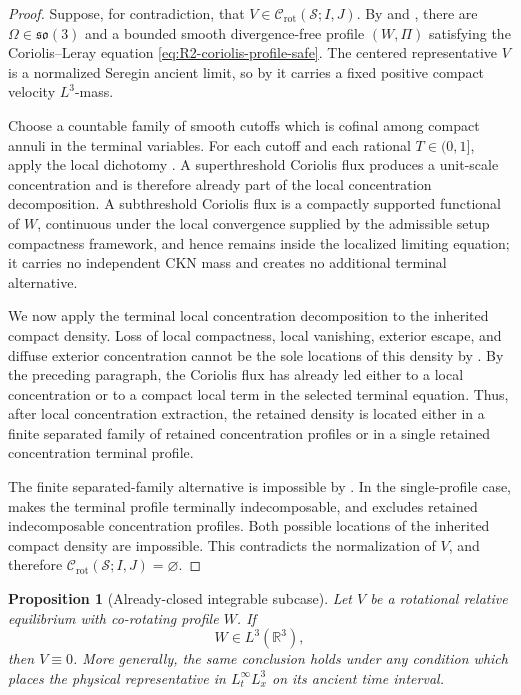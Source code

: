 \documentclass[11pt]{amsart}
\numberwithin{equation}{section}
\theoremstyle{plain}
\newtheorem{proposition}[theorem]{Proposition}
\theoremstyle{definition}
\theoremstyle{remark}
\newcommand{\Crot}{\mathcal C_{\mathrm{rot}}}
\begin{document}
\begin{proof}
Suppose, for contradiction, that
\(V\in\Crot(\mathcal S;I,J)\).  By
 and
, there are
\(\Omega\in\mathfrak{so}(3)\) and a bounded smooth divergence-free profile
\((W,\Pi)\) satisfying the Coriolis--Leray equation
\eqref{eq:R2-coriolis-profile-safe}.  The centered representative \(V\) is a
normalized Seregin ancient limit, so by
 it carries a fixed positive compact
velocity \(L^3\)-mass.

Choose a countable family of smooth cutoffs which is cofinal among compact
annuli in the terminal variables.  For each cutoff and each rational
\(T\in(0,1]\), apply the local dichotomy
.  A superthreshold Coriolis flux produces
a unit-scale concentration and is therefore already part of the local
concentration decomposition.  A subthreshold Coriolis flux is a compactly
supported functional
of \(W\), continuous under the local convergence supplied by the admissible setup
compactness framework, and hence remains inside the localized limiting equation; it carries no
independent CKN
mass and creates no additional terminal alternative.

We now apply the terminal local concentration decomposition to the inherited compact
density.  Loss of local compactness, local vanishing, exterior escape, and
diffuse exterior concentration cannot be the sole locations of this density by
.  By the preceding paragraph, the
Coriolis flux has already led either to a local concentration or to a
compact local term in the selected terminal equation.  Thus, after local
concentration extraction, the retained density is located either in a finite separated family
of retained concentration profiles or in a single retained concentration
terminal profile.

The finite separated-family alternative is impossible by
.  In the single-profile case,
 makes the terminal profile terminally
indecomposable, and  excludes retained
indecomposable concentration profiles.  Both possible locations of the inherited
compact density are impossible.  This
contradicts the normalization of \(V\), and therefore
\(\Crot(\mathcal S;I,J)=\varnothing\).
\end{proof}

\begin{proposition}[Already-closed integrable subcase]
\label{prop:R2-integrable-subcase}
Let \(V\) be a rotational relative equilibrium with co-rotating profile \(W\).
If
\begin{equation}\label{eq:R2-L3-subcase}
   W\in L^3(\mathbb R^3),
\end{equation}
then \(V\equiv0\).  More generally, the same conclusion holds under any
condition which places the physical representative in
\(L^\infty_tL^3_x\) on its ancient time interval.
\end{proposition}
\end{document}
